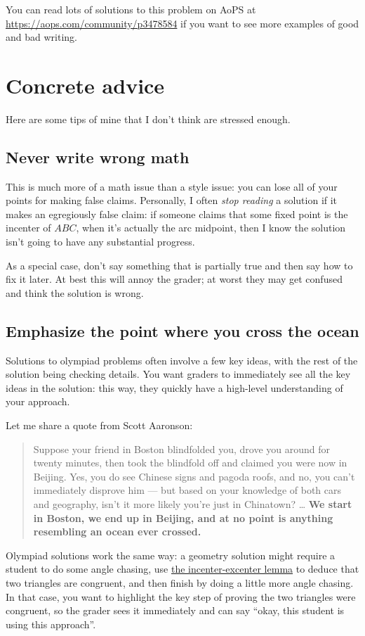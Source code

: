 \documentclass[11pt]{scrartcl}
\begin{document}
You can read lots of solutions to this problem on AoPS at
\url{https://aops.com/community/p3478584}
if you want to see more examples of good and bad writing.

\section{Concrete advice}
Here are some tips of mine that I don't think are stressed enough.

\subsection{Never write wrong math}
This is much more of a math issue than a style issue:
you can lose all of your points for making false claims.
Personally, I often \emph{stop reading} a solution if it makes
an egregiously false claim: if someone claims that some fixed
point is the incenter of $ABC$,
when it's actually the arc midpoint,
then I know the solution isn't going to have any substantial progress.

As a special case, don't say something that is partially true
and then say how to fix it later.
At best this will annoy the grader;
at worst they may get confused and think the solution is wrong.

\subsection{Emphasize the point where you cross the ocean}
Solutions to olympiad problems often involve a few key ideas,
with the rest of the solution being checking details.
You want graders to immediately see all the key ideas in the solution:
this way, they quickly have a high-level understanding of your approach.

Let me share a quote from Scott Aaronson:
\begin{quote}
  Suppose your friend in Boston blindfolded you,
  drove you around for twenty minutes,
  then took the blindfold off and claimed you were now in Beijing.
  Yes, you do see Chinese signs and pagoda roofs,
  and no, you can't immediately disprove him ---
  but based on your knowledge of both cars and geography,
  isn't it more likely you're just in Chinatown?
  \dots
  \textbf{We start in Boston, we end up in Beijing,
  and at no point is anything resembling an ocean ever crossed.}
\end{quote}
Olympiad solutions work the same way:
a geometry solution might require a student to do some angle chasing,
use \href{https://w.wiki/AEpo}{the incenter-excenter lemma} to deduce that two triangles are congruent,
and then finish by doing a little more angle chasing.
In that case, you want to highlight the key step of proving the two triangles
were congruent, so the grader sees it immediately and can say
``okay, this student is using this approach''.
\end{document}
